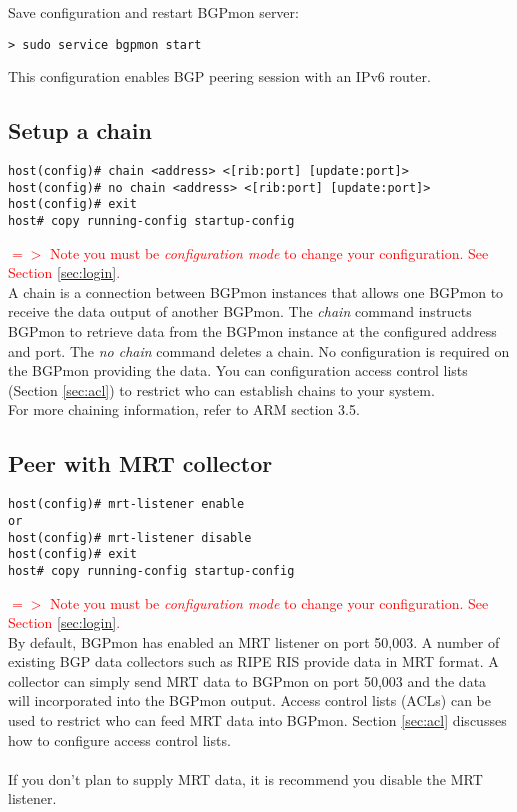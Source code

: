 \documentclass{article}
\newcommand\note[1]{\textcolor{red}{$=>$ #1}}
\begin{document}
Save configuration and restart BGPmon server:
\begin{Verbatim}[frame=single]
> sudo service bgpmon start 
\end{Verbatim}


This configuration enables BGP peering session with an IPv6 router.


\subsection{Setup a chain}
\label{sec:chain}

\begin{Verbatim}[frame=single]
host(config)# chain <address> <[rib:port] [update:port]>
host(config)# no chain <address> <[rib:port] [update:port]>
host(config)# exit
host# copy running-config startup-config
\end{Verbatim}
\note{Note you must be \emph{configuration mode} to change your configuration.   See Section \ref{sec:login}.}
\\
A chain is a connection between BGPmon instances that allows one BGPmon to receive
the data output of another BGPmon.  The \emph{chain} command instructs BGPmon to retrieve data from the BGPmon instance at the configured address and port.   The \emph{no chain} command deletes a chain.  No configuration is required on the BGPmon providing the data.   You can configuration access control lists (Section \ref{sec:acl}) to restrict who can establish chains to your system.   \\
For more chaining information, refer to ARM section 3.5.

\subsection{Peer with MRT collector}
\label{sec:mrt}\begin{Verbatim}[frame=single]
host(config)# mrt-listener enable 
or
host(config)# mrt-listener disable 
host(config)# exit
host# copy running-config startup-config
\end{Verbatim}
\note{Note you must be \emph{configuration mode} to change your configuration.   See Section \ref{sec:login}.}
\\
By default,  BGPmon has enabled an MRT listener on port 50,003.    A number of existing BGP data  collectors such as RIPE RIS provide data in MRT format.    A collector can simply send MRT data to BGPmon on port 50,003 and the data will incorporated into the BGPmon output.     Access control lists (ACLs) can be used to restrict who can feed MRT data into BGPmon.    Section \ref{sec:acl} discusses how to configure access control lists.
\\
\\
If you don't plan to supply MRT data,  it is recommend you disable the MRT listener.
\end{document}
